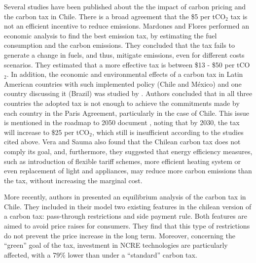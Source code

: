 \documentclass[11pt, letterpaper]{article}
\begin{document}

\smallskip

Several studies have been published about the the impact of carbon pricing and the carbon tax in Chile. There is a broad agreement that the \$5 per tCO$_2$ tax is not an efficient incentive to reduce emissions. Mardones and Flores \cite{mardones2017evaluation} performed an economic analysis to find the best emission tax, by estimating the fuel consumption and the carbon emissions. They concluded that the tax fails to generate a change in fuels, and thus, mitigate emissions, even for different costs scenarios. They estimated that a more effective tax is between \$13 - \$50 per  tCO$_2$. In addition, the economic and environmental effects of a carbon tax in Latin American countries with such implemented policy (Chile and M\'exico) and one country discussing it (Brazil) was studied by \cite{mardones2018economic}. Authors concluded that in all three countries the adopted tax is not enough to achieve the commitments made by each country in the Paris Agreement, particularly in the case of Chile. This issue is mentioned in the roadmap to 2050 document \cite{HojadeRuta}, noting that by 2030, the tax will increase to \$25 per tCO$_2$, which still is insufficient according to the studies cited above. Vera and Sauma \cite{vera2015does} also found that the Chilean carbon tax does not comply its goal, and, furthermore, they suggested that energy efficiency measures, such as introduction of flexible tariff schemes, more efficient heating system or even replacement of light and appliances, may reduce more carbon emissions than the tax, without increasing the marginal cost. 

\smallskip

More recently, authors in \cite{diaz2020equilibrium} presented an equilibrium analysis of the carbon tax in Chile. They included in their model two existing features in the chilean version of a carbon tax: pass-through restrictions and side payment rule. Both features are aimed to avoid  price raises for consumers. They find that this type of restrictions do not prevent the price increase in the long term. Moreover, concerning the ``green'' goal of the tax, investment in NCRE technologies are particularly affected, with a 79\% lower than under a ``standard'' carbon tax. 
\end{document}
